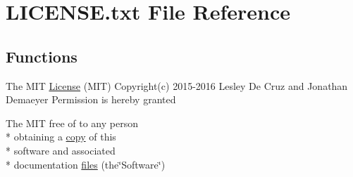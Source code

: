 \hypertarget{LICENSE_8txt}{\section{L\-I\-C\-E\-N\-S\-E.\-txt File Reference}
\label{LICENSE_8txt}
}
\subsection*{Functions}
\begin{DoxyCompactItemize}
\item 
The M\-I\-T \hyperlink{LICENSE_8txt_a5265396c41b42f76bb8ac88275c2535e}{License} (M\-I\-T) Copyright(c) 2015-\/2016 Lesley De Cruz and Jonathan Demaeyer Permission is hereby granted
\item 
The M\-I\-T free of to any person \\*
obtaining a \hyperlink{LICENSE_8txt_aff1d4c6b756ebf691fa44a0904f68658}{copy} of this \\*
software and associated \\*
documentation \hyperlink{LICENSE_8txt_abdb4f4971cf029244bb81834ee9b393d}{files} (the\char`\"{}Software\char`\"{})
\end{DoxyCompactItemize}
